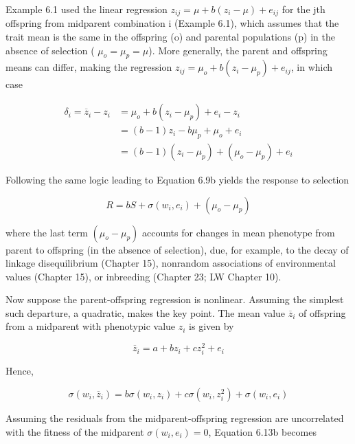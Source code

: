 \documentclass{article}
\begin{document}
Example 6.1 used the linear regression  $ z_{ij} = \mu + b(z_i - \mu) + e_{ij} $ for the jth offspring from midparent combination i (Example 6.1), which assumes that the trait mean is the same in the offspring (o) and parental populations (p) in the absence of selection ( $ \mu_o = \mu_p = \mu $). More generally, the parent and offspring means can differ, making the regression  $ z_{ij} = \mu_o + b(z_i - \mu_p) + e_{ij} $, in which case

\begin{equation}
\begin{aligned}\delta_{i}=\overline{z}_{i}-z_{i}&=\mu_{o}+b(z_{i}-\mu_{p})+e_{i}-z_{i}\\&=(b-1)z_{i}-b\mu_{p}+\mu_{o}+e_{i}\\&=(b-1)(z_{i}-\mu_{p})+(\mu_{o}-\mu_{p})+e_{i}\end{aligned}
\tag{6.11}
\label{eq:6_11}
\end{equation}

Following the same logic leading to Equation 6.9b yields the response to selection

\begin{equation}
R=bS+\sigma(w_{i},e_{i})+(\mu_{o}-\mu_{p})
\tag{6.12}
\label{eq:6_12}
\end{equation}

where the last term  $ (\mu_{o}-\mu_{p}) $ accounts for changes in mean phenotype from parent to offspring (in the absence of selection), due, for example, to the decay of linkage disequilibrium (Chapter 15), nonrandom associations of environmental values (Chapter 15), or inbreeding (Chapter 23; LW Chapter 10).

Now suppose the parent-offspring regression is nonlinear. Assuming the simplest such departure, a quadratic, makes the key point. The mean value  $ \overline{z}_{i} $ of offspring from a midparent with phenotypic value  $ z_{i} $ is given by

\begin{equation}
\overline{z}_{i}=a+b z_{i}+c z_{i}^{2}+e_{i}
\tag{6.13a}
\label{eq:6_13a}
\end{equation}

Hence,

\begin{equation}
\sigma(w_{i},\overline{z}_{i})=b\sigma\left(w_{i},z_{i}\right)+c\sigma\left(w_{i},z_{i}^{2}\right)+\sigma\left(w_{i},e_{i}\right)
\tag{6.13b}
\label{eq:6_13b}
\end{equation}

Assuming the residuals from the midparent-offspring regression are uncorrelated with the fitness of the midparent  $ \sigma(w_i, e_i) = 0 $, Equation 6.13b becomes
\end{document}
